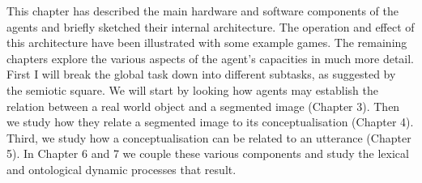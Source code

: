 This chapter has described the main hardware 
and software components of the agents and briefly sketched
their internal architecture. The operation and effect
of this architecture have been 
illustrated with some example games. The remaining chapters explore the 
various aspects of the agent's capacities in much more detail. 
First I will break the global task down into different subtasks, 
as suggested by the semiotic square. We will start by looking how agents 
may establish the relation between a real world object and 
a segmented image (Chapter 3). Then we study how they 
relate a segmented image to its conceptualisation (Chapter 4). 
Third, we study how a conceptualisation can be related to 
an utterance (Chapter 5). In Chapter 6 and 7 we couple these
various components and study the lexical and ontological 
dynamic processes that result. 

%

